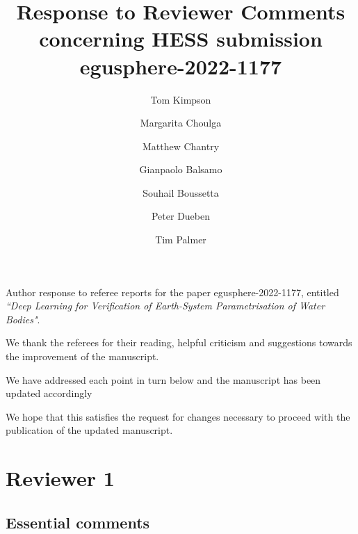 \documentclass[10pt]{article}
\author{Tom Kimpson \\ 
	\and Margarita Choulga\\ 
 \and Matthew Chantry\\
\and Gianpaolo Balsamo\\  
 \and Souhail Boussetta\\
  \and Peter Dueben\\
   \and Tim Palmer\\
}
\title{\normalsize Response to Reviewer  Comments
  concerning HESS submission egusphere-2022-1177}
\begin{document}
	\maketitle
\noindent Author response to referee reports for the paper egusphere-2022-1177,
entitled \textit{``Deep Learning for Verification of Earth-System Parametrisation of Water Bodies"}. \newline 

\noindent We thank the referees for their reading, helpful criticism and suggestions towards the improvement of the manuscript. \newline 

\noindent We have addressed each point in turn below and the manuscript has been updated accordingly \newline 

\noindent  We hope that this satisfies the request for changes necessary to proceed with the publication of the updated manuscript. \newline 




\newpage 
\section{Reviewer 1}


\subsection*{Essential comments}
\end{document}
